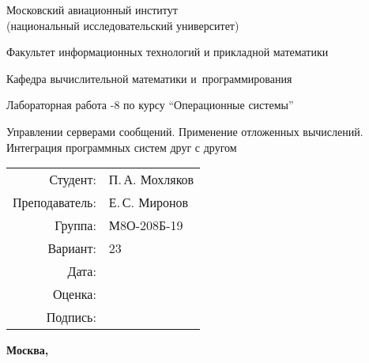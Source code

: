 \documentclass[pdf, unicode, 12pt, a4paper,oneside,fleqn]{article}
\begin{document}
\begin{titlepage}
    \begin{center}
        \bfseries

        {\Large Московский авиационный институт\\ (национальный исследовательский университет)}
        
        \vspace{48pt}
        
        {\large Факультет информационных технологий и прикладной математики}
        
        \vspace{36pt}
        
        {\large Кафедра вычислительной математики и~программирования}
        
        \vspace{48pt}
        
        Лабораторная работа -8 по курсу \enquote{Операционные системы}

        \vspace{48pt}

        Управлении серверами сообщений. Применение отложенных вычислений. Интеграция программных систем друг с другом
        
    \end{center}
    
    \vspace{125pt}
    
    \begin{flushright}
    \begin{tabular}{rl}
    Студент: & П.\,А. Мохляков \\
    Преподаватель: & Е.\,С. Миронов \\
    Группа: & М8О-208Б-19 \\
    Вариант: & 23 \\
    Дата: & \\
    Оценка: & \\
    Подпись: & \\
    \end{tabular}
    \end{flushright}
    
    \vfill
    
    \begin{center}
    \bfseries
    Москва, \the\year
    \end{center}
\end{titlepage}
    
\pagebreak
\end{document}
